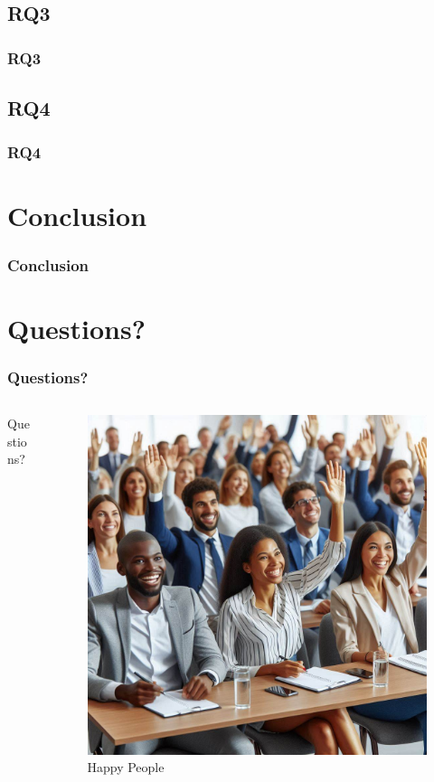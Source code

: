 \documentclass{beamer}
\begin{document}
\subsection{RQ3}
\begin{frame}
  \frametitle{RQ3}
\end{frame}

\subsection{RQ4}
\begin{frame}
  \frametitle{RQ4}
\end{frame}


\section{Conclusion}

\begin{frame}
  \frametitle{Conclusion}
\end{frame}

\section{Questions?}

\begin{frame}
  \frametitle{Questions?}
  \begin{columns}
    \begin{column}{0.5\textwidth}
      Questions?
    \end{column}
    \begin{column}{0.5\textwidth}
      \begin{figure}
        \caption{Happy People\footnotemark[1]}
        \includegraphics[width=.8\textwidth]{images/questions.jpeg}\footnotemark[1]
      \end{figure}
    \end{column}
  \end{columns}
\end{frame}
\end{document}
